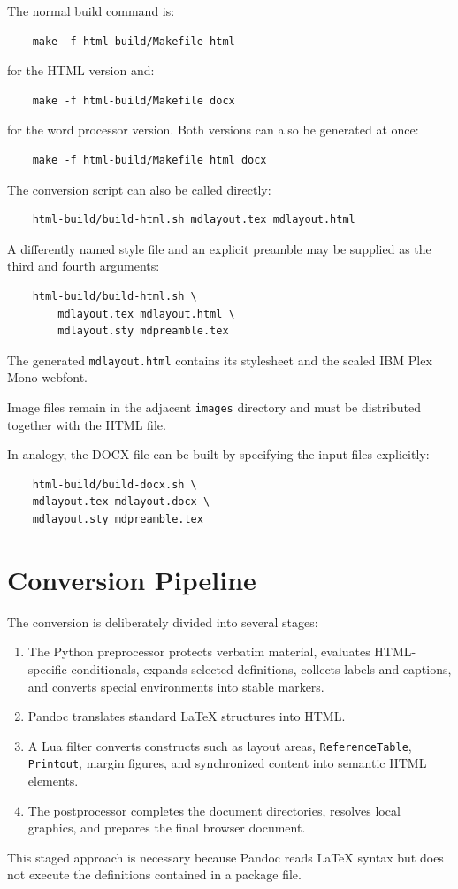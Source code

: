\documentclass[
11pt,
a4paper,
oneside
]{scrbook}
\begin{document}
{The normal build command is:
\begin{verbatim}
	make -f html-build/Makefile html
\end{verbatim}
for the HTML version and:
\begin{verbatim}
	make -f html-build/Makefile docx
\end{verbatim}
for the word processor version. Both versions can also be generated at once:
\begin{verbatim}
	make -f html-build/Makefile html docx
\end{verbatim}
The conversion script can also be called directly:
\begin{verbatim}
	html-build/build-html.sh mdlayout.tex mdlayout.html
\end{verbatim}
A differently named style file and an explicit preamble may be supplied as the
third and fourth arguments:
\begin{verbatim}
	html-build/build-html.sh \
		mdlayout.tex mdlayout.html \
		mdlayout.sty mdpreamble.tex
\end{verbatim}
The generated \texttt{mdlayout.html} contains its stylesheet and the scaled
IBM Plex Mono webfont.
\begin{note}
Image files remain in the adjacent \texttt{images}
directory and must be distributed together with the HTML file.
\end{note}
\noindent In analogy, the DOCX file can be built by specifying the input files
explicitly:
\begin{verbatim}
	html-build/build-docx.sh \
	mdlayout.tex mdlayout.docx \
	mdlayout.sty mdpreamble.tex
\end{verbatim}

\section{Conversion Pipeline}

The conversion is deliberately divided into several stages:
\begin{enumerate}
	\item The Python preprocessor protects verbatim material, evaluates
	HTML-specific conditionals, expands selected definitions, collects labels
	and captions, and converts special environments into stable markers.
	\item Pandoc translates standard \LaTeX{} structures into HTML.
	\item A Lua filter converts \mdlayout{} constructs such as layout areas,
	\texttt{ReferenceTable}, \texttt{Printout}, margin figures, and synchronized
	content into semantic HTML elements.
	\item The postprocessor completes the document directories, resolves local
	graphics, and prepares the final browser document.
\end{enumerate}
This staged approach is necessary because Pandoc reads \LaTeX{} syntax but does
not execute the definitions contained in a package file.

}
\end{document}
